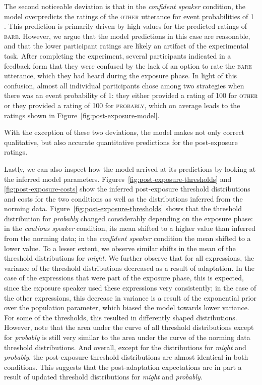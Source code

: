 \documentclass[man, floatsintext]{apa6}
\newcommand{\figref}[1]{Figure~\ref{#1}}
\begin{document}
The second noticeable deviation is that in the \textit{confident speaker} condition, the model overpredicts the ratings of the \textsc{other} utterance for event probabilities of 1 . This prediction is primarily driven by high values for the predicted ratings of \textsc{bare}. However, we argue that the model predictions in this case are reasonable, and that the lower participant ratings are likely an artifact of the experimental task. After completing the experiment, 
several participants indicated in a feedback form that they were confused by the lack of an option to rate the \textsc{bare} utterance, 
which they had heard during the exposure phase. In light of this confusion, almost all individual participants chose among two strategies when there was an event probability of 1: they either provided a rating of 100 for \textsc{other} 
or they provided a rating of 100 for \textsc{probably}, which on average leads to the ratings shown in \figref{fig:post-exposure-model}.

With the exception of these two deviations, the model makes not only correct qualitative, but also accurate quantitative predictions for the post-exposure ratings.

Lastly, we can also inspect how the model arrived at its predictions by looking at the inferred model parameters.  
Figures~\ref{fig:post-exposure-thresholds} and \ref{fig:post-exposure-costs} show the inferred
post-exposure threshold distributions and costs for the two conditions as well as the distributions inferred from the norming data.
Figure~\ref{fig:post-exposure-thresholds} shows that the threshold distribution for \textit{probably}
changed considerably depending on the exposure phase: in the \textit{cautious speaker} condition,
its mean shifted to a higher value than  inferred from the norming data; in the \textit{confident speaker} condition the mean 
shifted to a lower value. To a lesser extent, we observe similar shifts in the mean of the threshold
distributions for \textit{might}. We further observe that for all expressions, the variance of the threshold
distributions decreased as a result of adaptation. In the case of the expressions that were part of the exposure
phase, this is expected, since the exposure speaker used these expressions very consistently; in the case of the
other expressions, this decrease in variance is a result of the exponential prior over the population parameter,
which biased the model towards lower variance. For some of the thresholds, this resulted in differently shaped distributions.
However, note that the area under the curve of all threshold distributions except for \textit{probably} is still very similar to the 
area under the curve of the norming data threshold distributions. And overall, except for the distributions
for \textit{might} and \textit{probably}, the post-exposure threshold distributions are almost identical in both conditions.
This suggests that the post-adaptation expectations 
are in part a result of updated threshold distributions for \textit{might} and \textit{probably}.
\end{document}
